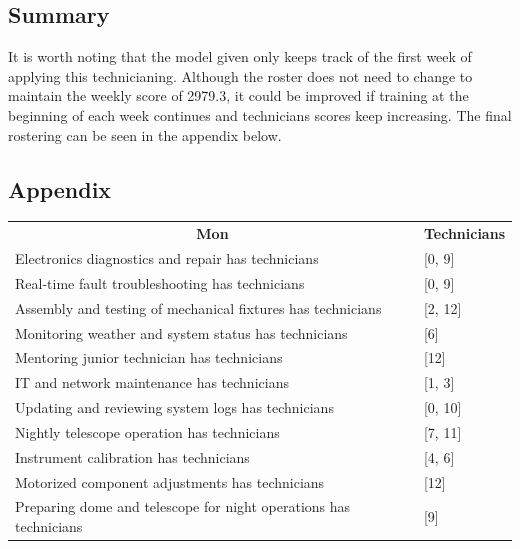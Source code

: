 \documentclass{article}
\begin{document}
\subsection*{Summary}
It is worth noting that the model given only keeps track of the first week of applying this technicianing.
Although the roster does not need to change to maintain the weekly score of 2979.3, it could be improved 
if training at the beginning of each week continues and technicians scores keep increasing.
The final rostering can be seen in the appendix below.

\newpage{}
\subsection*{Appendix}
\begin{table}[!ht]
\begin{tabular}{ll}
\multicolumn{1}{c}{\textbf{Mon}}                                  & \multicolumn{1}{c}{\textbf{Technicians}} \\
Electronics diagnostics and repair has technicians                & {[}0, 9{]}                               \\
Real-time fault troubleshooting has technicians                   & {[}0, 9{]}                               \\
Assembly and testing of mechanical fixtures has technicians       & {[}2, 12{]}                              \\
Monitoring weather and system status has technicians              & {[}6{]}                                  \\
Mentoring junior technician has technicians                            & {[}12{]}                                 \\
IT and network maintenance has technicians                        & {[}1, 3{]}                               \\
Updating and reviewing system logs has technicians                & {[}0, 10{]}                              \\
Nightly telescope operation has technicians                       & {[}7, 11{]}                              \\
Instrument calibration has technicians                            & {[}4, 6{]}                               \\
Motorized component adjustments has technicians                   & {[}12{]}                                 \\
Preparing dome and telescope for night operations has technicians & {[}9{]}                                  \\

\end{tabular}
\end{table}
\end{document}
